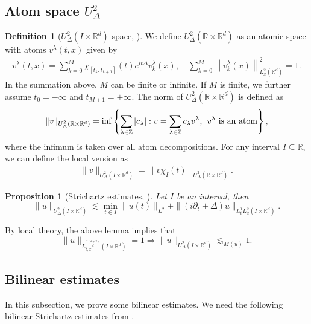 \documentclass[reqno,11pt]{amsart}
\theoremstyle{plain}
\newtheorem{proposition}[theorem]{Proposition}
\theoremstyle{definition}
\newtheorem{definition}[theorem]{Definition}
\numberwithin{equation}{section}
\numberwithin{theorem}{section}
\def\R{\mathbb{R}}
\begin{document}
\subsection{Atom space $U_{\Delta}^2$}
\begin{definition}[$U_\Delta^2(I\times\R^d)$ space, \cite{Dodson-AJM,Dodson-Duke,Dodson,HHK}]  We define $U_\Delta^2(\R\times\R^d)$ as an atomic space with atoms  $v^\lambda(t,x)$ given by 
\begin{align*}
v^\lambda(t,x)=\sum_{k=0}^{M}\chi_{[t_k,t_{k+1}]}(t)e^{it\Delta} v_k^\lambda(x),
\quad\sum_{k=0}^M\left\| v_k^\lambda(x) \right\|_{L_x^2(\R^d)}^2=1.
\end{align*}
In the summation above, $M$ can be finite or infinite. If $M$ is finite, we further assume $t_0=-\infty$ and $t_{M+1}=+\infty$. The norm of $U_\Delta^2 (\R\times\R^d)$ is defined as 
\begin{align*}
\| v \|_{U_\Delta^2(\R\times\R^d)}
=\inf\left\{\sum_{\lambda\in\mathbb{Z}} |c_\lambda|:  v =\sum_{\lambda\in\mathbb{Z}}c_\lambda  v^\lambda, \hspace{1ex} v^\lambda\mbox{ is an atom}\right\},
\end{align*}
where the infimum is taken over all atom decompositions.  For any  interval $I\subseteq\R$, we can define the local version as
\begin{align*}
\| v\|_{U_\Delta^2 \left(I\times\R^d\right)}=\| v \chi_I(t)\|_{U_\Delta^2 \left(\R\times\R^d\right)}.
\end{align*}
\end{definition}
\begin{proposition}[Strichartz estimates, \cite{Dodson-AJM,Dodson-Duke,Dodson,HHK}]
Let $I$ be an interval, then
\begin{equation}
\|u\|_{U_{\Delta}^2(I\times\R^d)}\lesssim \min_{t\in I}\|u(t)\|_{L^2}+\|(i\partial_t+\Delta)u\|_{L_t^1L_x^2(I\times\R^d)}.
\end{equation}
\end{proposition}
By local theory, the above lemma implies that
\begin{equation}\label{localboundU2}
\|u\|_{L_{t,x}^{\frac{2(d+2)}{d}}(I\times\R^d)}=1\Rightarrow\|u\|_{U_{\Delta}^2(I\times\R^d)}\lesssim_{M(u)}1.  
\end{equation}

\subsection{Bilinear estimates}
In this subsection, we prove some bilinear estimates. We need the following bilinear Strichartz estimates from \cite{KV}.
\end{document}
